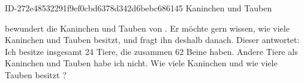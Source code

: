\begin{exercise}
      {ID-272e48532291f9ef0cbd6378d342d6bebc686145}
      {Kaninchen und Tauben}
  \ifproblem\problem\par
    \xya{} bewundert die Kaninchen und Tauben von \xyb. Er möchte gern wissen,
    wie viele Kaninchen und Tauben \xyb{} besitzt, und fragt ihn deshalb danach.
    Dieser antwortet: \glqq{}Ich besitze insgesamt 24 Tiere, die zusammen 62 Beine
    haben. Andere Tiere als Kaninchen und Tauben habe ich nicht.\grqq{}
    Wie viele Kaninchen und wie viele Tauben besitzt \xyb?
  \fi
\end{exercise}
